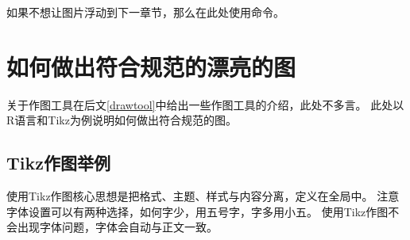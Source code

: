 \begin{figure}[!h]
\begin{sideways}
\begin{minipage}{\textheight}
		\end{minipage}
	\end{sideways}
\end{figure}

\clearpage

如果不想让图片浮动到下一章节，那么在此处使用命令。

\section{如何做出符合规范的漂亮的图}
关于作图工具在后文\ref{drawtool}中给出一些作图工具的介绍，此处不多言。
此处以R语言和Tikz为例说明如何做出符合规范的图。

\subsection{Tikz作图举例}
使用Tikz作图核心思想是把格式、主题、样式与内容分离，定义在全局中。
注意字体设置可以有两种选择，如何字少，用五号字，字多用小五。
使用Tikz作图不会出现字体问题，字体会自动与正文一致。

